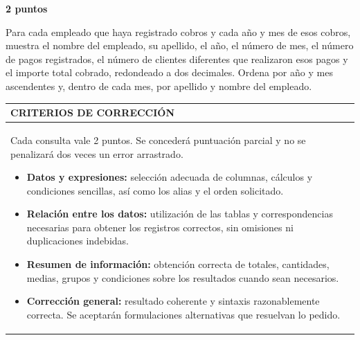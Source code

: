 \documentclass[11pt,a4paper]{article}
\begin{document}
\par\medskip{}\hfill{\color{LBcereza}\bfseries 2 puntos}\par\smallskip
Para cada empleado que haya registrado cobros y cada año y mes de esos cobros, muestra el nombre del empleado, su apellido, el año, el número de mes, el número de pagos registrados, el número de clientes diferentes que realizaron esos pagos y el importe total cobrado, redondeado a dos decimales. Ordena por año y mes ascendentes y, dentro de cada mes, por apellido y nombre del empleado.\par\medskip
\medskip\noindent\begin{tabularx}{\textwidth}{|X|}\hline
\cellcolor{LBgris}\color{LBcian}\bfseries CRITERIOS DE CORRECCIÓN \\ \hline
\begin{minipage}{\dimexpr\linewidth-2\tabcolsep\relax}\vspace{2mm}\small Cada consulta vale 2 puntos. Se concederá puntuación parcial y no se penalizará dos veces un error arrastrado.\par\smallskip \begin{itemize}[leftmargin=4mm,nosep]\item \textbf{Datos y expresiones:} selección adecuada de columnas, cálculos y condiciones sencillas, así como los alias y el orden solicitado.
\item \textbf{Relación entre los datos:} utilización de las tablas y correspondencias necesarias para obtener los registros correctos, sin omisiones ni duplicaciones indebidas.
\item \textbf{Resumen de información:} obtención correcta de totales, cantidades, medias, grupos y condiciones sobre los resultados cuando sean necesarios.
\item \textbf{Corrección general:} resultado coherente y sintaxis razonablemente correcta. Se aceptarán formulaciones alternativas que resuelvan lo pedido.
\end{itemize}\vspace{2mm}\end{minipage} \\ \hline
\end{tabularx}\medskip
\end{document}
